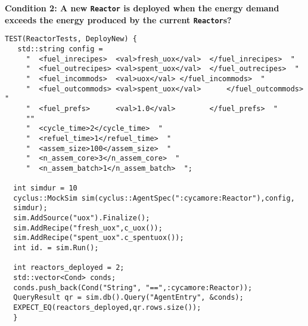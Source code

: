 \documentclass[12pt,letterpaper]{article}
\begin{document}
\noindent
\textbf{Condition 2: A new \texttt{Reactor} is deployed when the energy demand exceeds the energy produced by the current \texttt{Reactor}s?} 
\begin{verbatim}
TEST(ReactorTests, DeployNew) {
   std::string config = 
     "  <fuel_inrecipes>  <val>fresh_uox</val>  </fuel_inrecipes>  "
     "  <fuel_outrecipes> <val>spent_uox</val>  </fuel_outrecipes>  "
     "  <fuel_incommods>  <val>uox</val> </fuel_incommods>  "
     "  <fuel_outcommods> <val>spent_uox</val>      </fuel_outcommods>  "
     "  <fuel_prefs>      <val>1.0</val>        </fuel_prefs>  "
     ""
     "  <cycle_time>2</cycle_time>  "
     "  <refuel_time>1</refuel_time>  "
     "  <assem_size>100</assem_size>  "
     "  <n_assem_core>3</n_assem_core>  "
     "  <n_assem_batch>1</n_assem_batch>  ";

  int simdur = 10 
  cyclus::MockSim sim(cyclus::AgentSpec(":cycamore:Reactor"),config,
  simdur); 
  sim.AddSource("uox").Finalize();
  sim.AddRecipe("fresh_uox",c_uox());
  sim.AddRecipe("spent_uox".c_spentuox());
  int id. = sim.Run();
  
  int reactors_deployed = 2; 
  std::vector<Cond> conds; 
  conds.push_back(Cond("String", "==",:cycamore:Reactor)); 
  QueryResult qr = sim.db().Query("AgentEntry", &conds);
  EXPECT_EQ(reactors_deployed,qr.rows.size());
  }
\end{verbatim}
\end{document}
